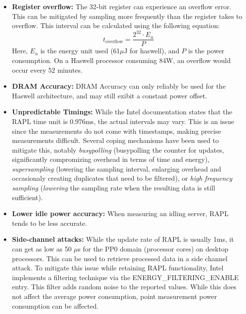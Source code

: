 \begin{itemize}
    \item \textbf{Register overflow: }The 32-bit register can experience an overflow error\parencite{khan2018rapl, raffin2024dissecting}. This can be mitigated by sampling more frequently than the register takes to overflow. This interval can be calculated using the following equation: 
    \begin{equation}
        t_{\text{overflow}} = \frac{2^{32} \cdot E_u}{P}
    \end{equation}
    Here, $E_u$ is the energy unit used (61$\mu$J for haswell), and $P$ is the power consumption. On a Haswell processor consuming 84W, an overflow would occur every 52 minutes.
    \item \textbf{DRAM Accuracy: }DRAM Accuracy can only reliably be used for the Haswell architecture\parencite{desrochers2016validation, khan2018rapl}, and may still exibit a constant power offset.
    \item \textbf{Unpredictable Timings: }While the Intel documentation states that the RAPL time unit is 0.976ms, the actual intervals may vary. This is an issue since the measurements do not come with timestamps, making precise measurements difficult\parencite{khan2018rapl}. Several coping mechanisms have been used to mitigate this, notably \textit{busypolling} (busypolling the counter for updates, significantly compromizing overhead in terms of time and energy\parencite{hahnel2012measuring}), \textit{supersampling} (lowering the sampling interval, enlarging overhead and occasionaly creating duplicates that need to be filtered\parencite{khan2018rapl}), or \textit{high frequency sampling} (\textit{lowering} the sampling rate when the resulting data is still sufficient\parencite{servat2016detailed}).
    \item \textbf{Lower idle power accuracy: } When measuring an idling server, RAPL tends to be less accurate\parencite{schone2024energy, desrochers2016validation}.
    \item \textbf{Side-channel attacks: } While the update rate of RAPL is usually 1ms, it can get as low as 50 $\mu$s for the PP0 domain (processor cores) on desktop processors. This can be used to retrieve processed data in a side channel attack\parencite{lipp2021platypus, schone2024energy}. To mitigate this issue while retaining RAPL functionality, Intel implements a filtering technique via the ENERGY\_FILTERING\_ENABLE\parencite{intel2023, Table 2-2} entry. This filter adds random noise to the reported values. While this does not affect the average power consumption, point measurement power consumption can be affected.
\end{itemize}


